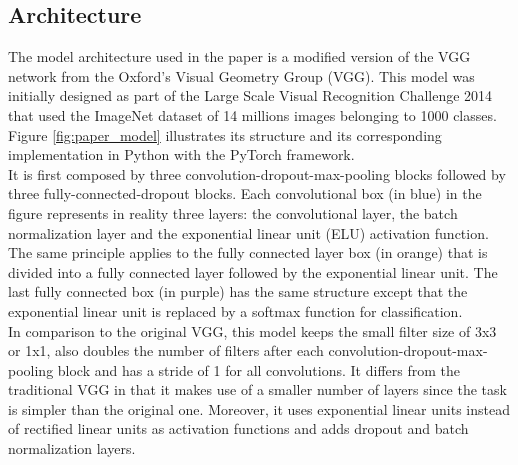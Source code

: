 \subsection{Architecture}
The model architecture used in the paper is a modified version of the VGG network from the Oxford's Visual Geometry Group (VGG). This model was initially designed as part of the Large Scale Visual Recognition Challenge 2014 that used the ImageNet dataset of 14 millions images belonging to 1000 classes. Figure \ref{fig:paper_model} illustrates its structure and its corresponding implementation in Python with the PyTorch framework.\\
It is first composed by three convolution-dropout-max-pooling blocks followed by three fully-connected-dropout blocks. Each convolutional box (in blue) in the figure represents in reality three layers: the convolutional layer, the batch normalization layer and the exponential linear unit (ELU) activation function. The same principle applies to the fully connected layer box (in orange) that is divided into a fully connected layer followed by the exponential linear unit. The last fully connected box (in purple) has the same structure except that the exponential linear unit is replaced by a softmax  function for classification.\\
In comparison to the original VGG, this model keeps the small filter size of 3x3 or 1x1, also doubles the number of filters after each convolution-dropout-max-pooling block and has a stride of 1 for all convolutions. It differs from the traditional VGG in that it makes use of a smaller number of layers since the task is simpler than the original one. Moreover, it uses exponential linear units instead of rectified linear units as activation functions and adds dropout and batch normalization layers.
